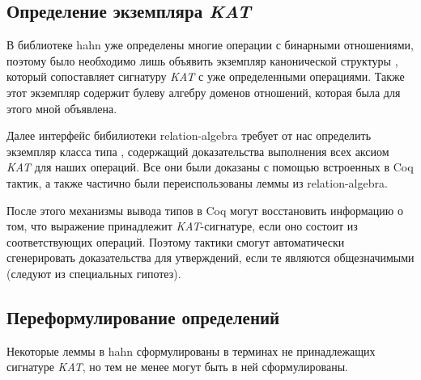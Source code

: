 \documentclass[times
              ]{itmo-student-thesis}
\begin{document}
    \subsection{Определение экземпляра \textit{KAT}}

      В библиотеке hahn уже определены многие операции с бинарными отношениями, поэтому было необходимо
      лишь объявить экземпляр канонической структуры , который сопоставляет сигнатуру
      \textit{KAT} с уже определенными операциями.
      Также этот экземпляр содержит булеву алгебру доменов отношений, которая была для этого мной
      объявлена.

      Далее интерфейс бибилиотеки relation-algebra требует от нас определить экземпляр класса типа
      , содержащий доказательства выполнения всех аксиом \textit{KAT} для наших операций.
      Все они были доказаны с помощью встроенных в Coq тактик, а также частично были переиспользованы
      леммы из relation-algebra.

      После этого механизмы вывода типов в Coq могут восстановить информацию о том, что выражение
      принадлежит \textit{KAT}-сигнатуре, если оно состоит из соответствующих операций.
      Поэтому тактики  смогут автоматически сгенерировать доказательства для
      утверждений, если те являются
      общезначимыми (следуют из специальных гипотез).


    \subsection{Переформулирование определений}

      Некоторые леммы в hahn сформулированы в терминах не принадлежащих сигнатуре \textit{KAT}, но тем не менее
      могут быть в ней сформулированы.
\end{document}
